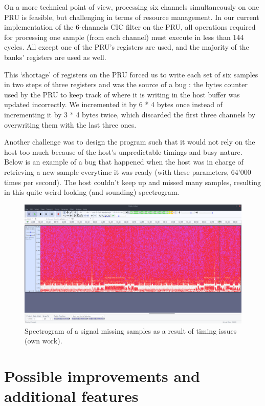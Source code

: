 \documentclass[]{report}
\begin{document}
On a more technical point of view, processing six channels simultaneously on one PRU is feasible, but challenging in terms of resource management. In our current implementation of the 6-channels CIC filter on the PRU, all operations required for processing one sample (from each channel) must execute in less than 144 cycles. All except one of the PRU's registers are used, and the majority of the banks' registers are used as well.

This `shortage' of registers on the PRU forced us to write each set of six samples in two steps of three registers and was the source of a bug : the bytes counter used by the PRU to keep track of where it is writing in the host buffer was updated incorrectly. We incremented it by 6 * 4 bytes once instead of incrementing it by 3 * 4 bytes twice, which discarded the first three channels by overwriting them with the last three ones.

Another challenge was to design the program such that it would not rely on the host too much because of the host's unpredictable timings and busy nature. Below is an example of a bug that happened when the host was in charge of retrieving a new sample everytime it was ready (with these parameters, 64'000 times per second). The host couldn't keep up and missed many samples, resulting in this quite weird looking (and sounding) spectrogram.

\begin{figure}[H]
\centering
\includegraphics[width=1.0\linewidth]{Pictures/timing_bug.png}
\caption{Spectrogram of a signal missing samples as a result of timing
issues (own work).}
\end{figure}

\hypertarget{possible-improvements-and-additional-features}{%
\chapter{Possible improvements and additional
features}\label{possible-improvements-and-additional-features}}
\end{document}
